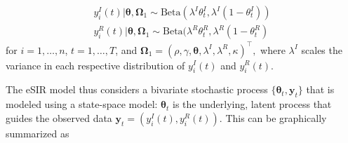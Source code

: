 \documentclass[10pt,a4paper]{article}
\begin{document}
%
\begin{equation}\label{statespace}
	\begin{aligned}
		y_{i}^I(t) | \boldsymbol{\theta}, \boldsymbol{\Omega}_1 \sim \text{Beta}(\lambda^I \theta_t^I, \lambda^I(1 - \theta_t^I)) \\
		y_{i}^R(t) | \boldsymbol{\theta}, \boldsymbol{\Omega}_1 \sim \text{Beta}(\lambda^R \theta_t^R, \lambda^R(1 - \theta_t^R)
	\end{aligned}
\end{equation}
%
for 
%
$i=1, \ldots, n$, $t=1, \ldots, T$,
%
and
%
$
\boldsymbol{\Omega}_1 = (\rho, \gamma, \boldsymbol{\theta}, \lambda^I, \lambda^R, \kappa)^\top,
$
%
where $\lambda^I$ scales the variance in each respective distribution of $y_i^I(t)$ and $y_i^R(t)$.

The eSIR model thus considers a bivariate stochastic process $\{\boldsymbol{\theta}_t, \mathbf{y}_t\}$ that is modeled using a state-space model: $\boldsymbol{\theta}_t$ is the underlying, latent process that guides the observed data $\boldsymbol{y}_t = (y_i^I(t), y_i^R(t))$. This can be graphically summarized as
\end{document}
